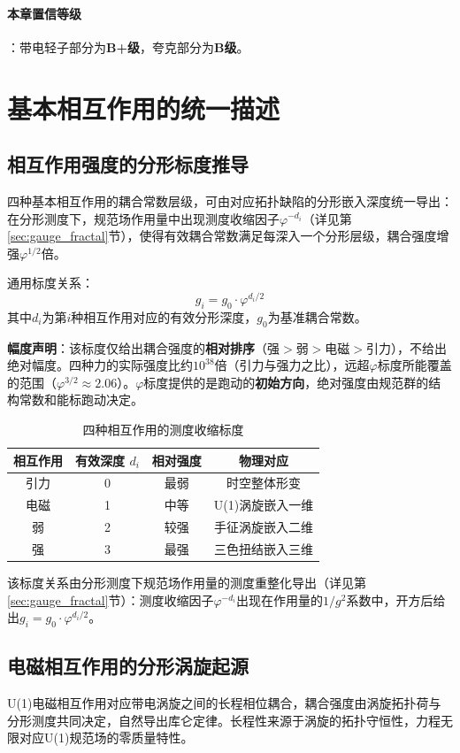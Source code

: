 \documentclass[12pt,a4paper,twocolumn]{article}
\renewcommand{\phi}{\varphi}
\begin{document}
\paragraph{本章置信等级}：带电轻子部分为\textbf{B+级}，夸克部分为\textbf{B级}。

\section{基本相互作用的统一描述}
\label{sec:unified_forces}

\subsection{相互作用强度的分形标度推导}
四种基本相互作用的耦合常数层级，可由对应拓扑缺陷的分形嵌入深度统一导出：在分形测度下，规范场作用量中出现测度收缩因子$\phi^{-d_i}$（详见第\ref{sec:gauge_fractal}节），使得有效耦合常数满足每深入一个分形层级，耦合强度增强$\phi^{1/2}$倍。

通用标度关系：
\[
g_i = g_0 \cdot \phi^{d_i/2}
\]
其中$d_i$为第$i$种相互作用对应的有效分形深度，$g_0$为基准耦合常数。

\textbf{幅度声明}：该标度仅给出耦合强度的\textbf{相对排序}（强$>$弱$>$电磁$>$引力），不给出绝对幅度。四种力的实际强度比约$10^{38}$倍（引力与强力之比），远超$\phi$标度所能覆盖的范围（$\phi^{3/2}\approx 2.06$）。$\phi$标度提供的是跑动的\textbf{初始方向}，绝对强度由规范群的结构常数和能标跑动决定。

\begin{table}[H]
\centering
\footnotesize
\caption{四种相互作用的测度收缩标度}
\begin{tabular}{c|c|c|c}
\hline
\textbf{相互作用} & \textbf{有效深度} $d_i$ & \textbf{相对强度} & \textbf{物理对应} \\
\hline
引力 & 0 & 最弱 & 时空整体形变 \\
电磁 & 1 & 中等 & U(1)涡旋嵌入一维 \\
弱 & 2 & 较强 & 手征涡旋嵌入二维 \\
强 & 3 & 最强 & 三色扭结嵌入三维 \\
\hline
\end{tabular}
\end{table}

该标度关系由分形测度下规范场作用量的测度重整化导出（详见第\ref{sec:gauge_fractal}节）：测度收缩因子$\phi^{-d_i}$出现在作用量的$1/g^2$系数中，开方后给出$g_i = g_0 \cdot \phi^{d_i/2}$。

\subsection{电磁相互作用的分形涡旋起源}
U(1)电磁相互作用对应带电涡旋之间的长程相位耦合，耦合强度由涡旋拓扑荷与分形测度共同决定，自然导出库仑定律。长程性来源于涡旋的拓扑守恒性，力程无限对应U(1)规范场的零质量特性。
\end{document}
